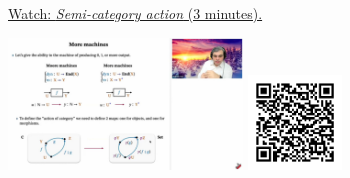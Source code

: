 
\begin{minipage}{10cm}
    \href{https://act4e-spring21.netlify.app/videos/spring2021-actions:semi-cat-actions.html}{Watch: \emph{Semi-category action} (3 minutes).}
        
    \href{https://act4e-spring21.netlify.app/videos/spring2021-actions:semi-cat-actions.html}{\includegraphics[height=3.5cm]{spring2021-actions:semi-cat-actions/thumbnails.jpg}}
    \href{https://act4e-spring21.netlify.app/videos/spring2021-actions:semi-cat-actions.html}{\includegraphics[height=2.5cm]{spring2021-actions:semi-cat-actions/qrcode.png}}
\end{minipage}
